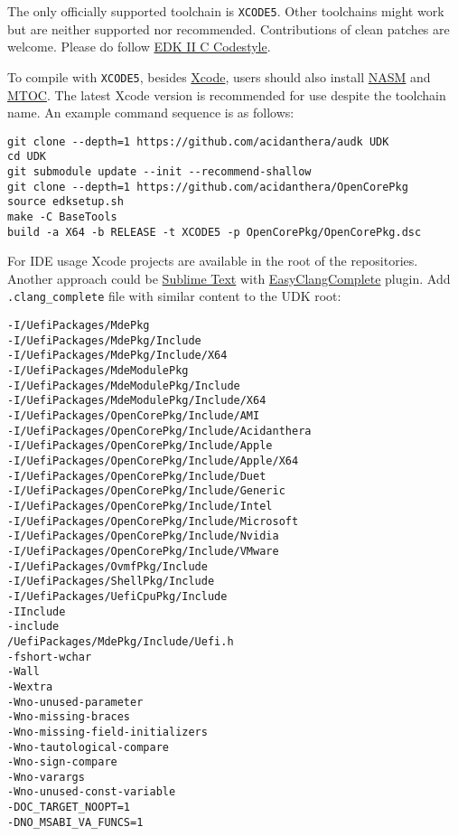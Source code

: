 \documentclass[]{article}
\begin{document}
The only officially supported toolchain is \texttt{XCODE5}. Other toolchains
might work but are neither supported nor recommended. Contributions of clean
patches are welcome. Please do follow
\href{https://github.com/tianocore/tianocore.github.io/wiki/Code-Style-C}{EDK II C Codestyle}.

To compile with \texttt{XCODE5}, besides \href{https://developer.apple.com/xcode}{Xcode},
users should also install \href{https://www.nasm.us}{NASM} and
\href{https://github.com/acidanthera/ocbuild/tree/master/external}{MTOC}.
The latest Xcode version is recommended for use despite the toolchain name.
An example command sequence is as follows:

\begin{lstlisting}[caption=Compilation Commands, label=compile, style=ocbash]
git clone --depth=1 https://github.com/acidanthera/audk UDK
cd UDK
git submodule update --init --recommend-shallow
git clone --depth=1 https://github.com/acidanthera/OpenCorePkg
source edksetup.sh
make -C BaseTools
build -a X64 -b RELEASE -t XCODE5 -p OpenCorePkg/OpenCorePkg.dsc
\end{lstlisting}

For IDE usage Xcode projects are available in the root of the repositories. Another
approach could be \href{https://www.sublimetext.com}{Sublime Text} with
\href{https://niosus.github.io/EasyClangComplete}{EasyClangComplete} plugin.
Add \texttt{.clang\_complete} file with similar content to the UDK root:

\begin{lstlisting}[caption=ECC Configuration, label=eccfile, style=ocbash]
-I/UefiPackages/MdePkg
-I/UefiPackages/MdePkg/Include
-I/UefiPackages/MdePkg/Include/X64
-I/UefiPackages/MdeModulePkg
-I/UefiPackages/MdeModulePkg/Include
-I/UefiPackages/MdeModulePkg/Include/X64
-I/UefiPackages/OpenCorePkg/Include/AMI
-I/UefiPackages/OpenCorePkg/Include/Acidanthera
-I/UefiPackages/OpenCorePkg/Include/Apple
-I/UefiPackages/OpenCorePkg/Include/Apple/X64
-I/UefiPackages/OpenCorePkg/Include/Duet
-I/UefiPackages/OpenCorePkg/Include/Generic
-I/UefiPackages/OpenCorePkg/Include/Intel
-I/UefiPackages/OpenCorePkg/Include/Microsoft
-I/UefiPackages/OpenCorePkg/Include/Nvidia
-I/UefiPackages/OpenCorePkg/Include/VMware
-I/UefiPackages/OvmfPkg/Include
-I/UefiPackages/ShellPkg/Include
-I/UefiPackages/UefiCpuPkg/Include
-IInclude
-include
/UefiPackages/MdePkg/Include/Uefi.h
-fshort-wchar
-Wall
-Wextra
-Wno-unused-parameter
-Wno-missing-braces
-Wno-missing-field-initializers
-Wno-tautological-compare
-Wno-sign-compare
-Wno-varargs
-Wno-unused-const-variable
-DOC_TARGET_NOOPT=1
-DNO_MSABI_VA_FUNCS=1
\end{lstlisting}
\end{document}
